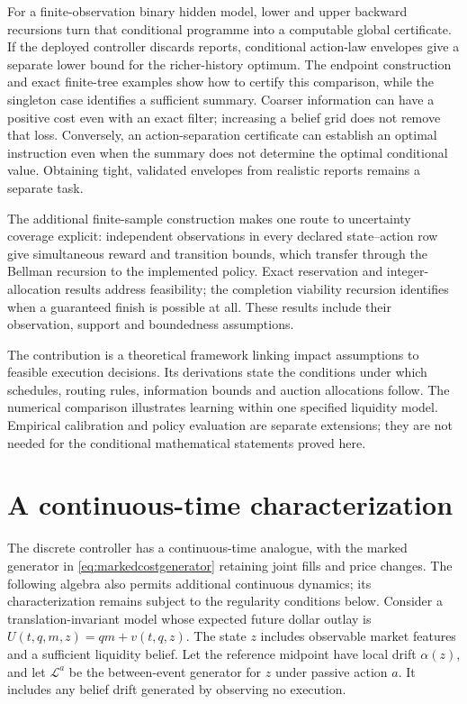 \documentclass[11pt]{article}
\numberwithin{equation}{section}
\theoremstyle{definition}
\theoremstyle{remark}
\theoremstyle{definition}
\begin{document}
For a finite-observation binary hidden model, lower and upper backward
recursions turn that conditional programme into a computable global
certificate. If the deployed controller discards reports, conditional
action-law envelopes give a separate lower bound for the richer-history
optimum. The endpoint construction and exact finite-tree examples show how
to certify this comparison, while the singleton case identifies a sufficient
summary. Coarser information can have a positive cost even with an exact
filter; increasing a belief grid does not remove that loss. Conversely,
an action-separation certificate can establish an optimal instruction even
when the summary does not determine the optimal conditional value.
Obtaining tight, validated envelopes from realistic reports remains a
separate task.

The additional finite-sample construction makes one route to uncertainty
coverage explicit: independent observations in every declared state--action
row give simultaneous reward and transition bounds, which transfer through
the Bellman recursion to the implemented policy. Exact reservation and
integer-allocation results address feasibility; the completion viability
recursion identifies when a guaranteed finish is possible at all. These
results include their observation, support and boundedness assumptions.

The contribution is a theoretical framework linking impact assumptions to
feasible execution decisions. Its derivations state the conditions under which
schedules, routing rules, information bounds and auction allocations follow.
The numerical comparison illustrates learning within one specified liquidity
model. Empirical calibration and policy evaluation are separate extensions;
they are not needed for the conditional mathematical statements proved here.

\appendix
\section{A continuous-time characterization}\label{app:hjb}

The discrete controller has a continuous-time analogue, with the marked
generator in \eqref{eq:markedcostgenerator} retaining joint fills and price
changes. The following algebra also permits additional continuous dynamics;
its characterization remains subject to the regularity conditions below. Consider a translation-invariant
model whose expected future dollar outlay is $U(t,q,m,z)=qm+v(t,q,z)$.
The state $z$ includes observable market features and a sufficient liquidity
belief. Let the reference midpoint have local drift $\alpha(z)$, and let
$\mathcal L^a$ be the between-event generator for $z$ under passive action $a$.
It includes any belief drift generated by observing no execution.
\end{document}

